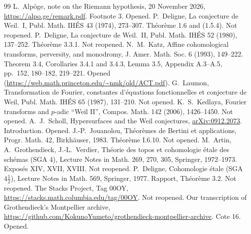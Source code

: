 \documentclass[11pt,a4paper]{article}
\theoremstyle{plain}
\theoremstyle{definition}
\theoremstyle{remark}
\begin{document}
\begin{thebibliography}{99}
 L.~Alp\"oge, note on the Riemann hypothesis, 20 November 2026, \url{https://alpo.ge/remark.pdf}.
Footnote 3. Opened.
 P.~Deligne, La conjecture de Weil.~I, Publ. Math. IH\'ES 43 (1974), 273--307. Th\'eor\`eme 1.6 and
(1.5.4). Not reopened.
 P.~Deligne, La conjecture de Weil.~II, Publ. Math. IH\'ES 52 (1980), 137--252. Th\'eor\`eme 3.3.1. Not
reopened.
 N.~M.~Katz, Affine cohomological transforms, perversity, and monodromy, J. Amer. Math. Soc. 6 (1993),
149--222. Theorem 3.4, Corollaries 3.4.1 and 3.4.3, Lemma 3.5, Appendix A.3--A.5, pp.~152, 180--182, 219--221. Opened
(\url{https://web.math.princeton.edu/~nmk/old/ACT.pdf}).
 G.~Laumon, Transformation de Fourier, constantes d'\'equations fonctionnelles et conjecture de Weil, Publ.
Math. IH\'ES 65 (1987), 131--210. Not opened.
 K.~S.~Kedlaya, Fourier transforms and $p$-adic ``Weil II'', Compos. Math. 142 (2006), 1426--1450. Not
opened.
 A.~J.~Scholl, Hypersurfaces and the Weil conjectures, \href{https://arxiv.org/abs/0912.2073}{arXiv:0912.2073}.
Introduction. Opened.
 J.-P.~Jouanolou, Th\'eor\`emes de Bertini et applications, Progr. Math. 42, Birkh\"auser, 1983.
Th\'eor\`eme I.6.10. Not opened.
 M.~Artin, A.~Grothendieck, J.-L.~Verdier, Th\'eorie des topos et cohomologie \'etale des sch\'emas (SGA 4),
Lecture Notes in Math. 269, 270, 305, Springer, 1972--1973. Expos\'es XIV, XVII, XVIII. Not reopened.
 P.~Deligne, Cohomologie \'etale (SGA $4\frac12$), Lecture Notes in Math. 569, Springer, 1977. Rapport,
Th\'eor\`eme 3.2. Not reopened.
 The Stacks Project, Tag 00OY, \url{https://stacks.math.columbia.edu/tag/00OY}. Not reopened.
 Our transcription of Grothendieck's Montpellier archive,
\url{https://github.com/KokunoYumeto/grothendieck-montpellier-archive}. Cote 16. Opened.
\end{thebibliography}
\end{document}
